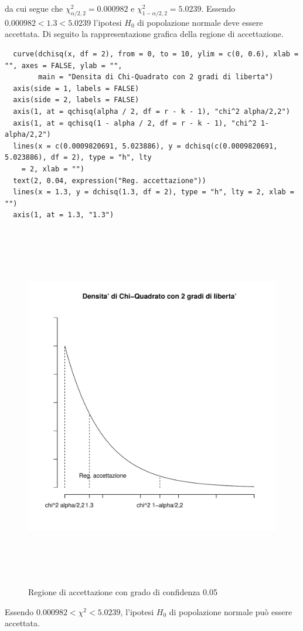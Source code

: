 da cui segue che $\chi_{\alpha/2,2}^2 = 0.000982$ e $\chi_{1-\alpha/2,2}^2 = 5.0239$. Essendo $0.000982 < 1.3 < 5.0239$ l'ipotesi $H_0$ di popolazione normale deve essere accettata. Di seguito la rappresentazione grafica della regione di accettazione.

\begin{lstlisting}
  curve(dchisq(x, df = 2), from = 0, to = 10, ylim = c(0, 0.6), xlab = "", axes = FALSE, ylab = "",
        main = "Densita di Chi-Quadrato con 2 gradi di liberta")
  axis(side = 1, labels = FALSE)
  axis(side = 2, labels = FALSE)
  axis(1, at = qchisq(alpha / 2, df = r - k - 1), "chi^2 alpha/2,2")
  axis(1, at = qchisq(1 - alpha / 2, df = r - k - 1), "chi^2 1-alpha/2,2")
  lines(x = c(0.0009820691, 5.023886), y = dchisq(c(0.0009820691, 5.023886), df = 2), type = "h", lty
    = 2, xlab = "")
  text(2, 0.04, expression("Reg. accettazione"))
  lines(x = 1.3, y = dchisq(1.3, df = 2), type = "h", lty = 2, xlab = "")
  axis(1, at = 1.3, "1.3")
\end{lstlisting}

\begin{figure}[!htbp]
    \centering
    \includegraphics[height=16cm]{capitoli/images/4_chiquadrato/densChiFinal.pdf}
    \caption{ Regione di accettazione con grado di confidenza 0.05
}
\end{figure}

Essendo $0.000982 < \chi^2 < 5.0239$, l'ipotesi $H_0$ di popolazione normale può essere accettata.


\newpage